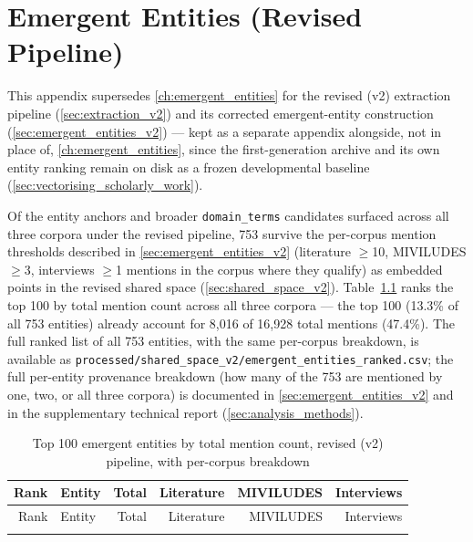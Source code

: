 \chapter{Emergent Entities (Revised Pipeline)}\label{ch:emergent_entities_v2}

This appendix supersedes \ref{ch:emergent_entities} for the revised (v2) extraction pipeline (\ref{sec:extraction_v2}) and its corrected emergent-entity construction (\ref{sec:emergent_entities_v2}) — kept as a separate appendix alongside, not in place of, \ref{ch:emergent_entities}, since the first-generation archive and its own entity ranking remain on disk as a frozen developmental baseline (\ref{sec:vectorising_scholarly_work}).

Of the entity anchors and broader \texttt{domain\_terms} candidates surfaced across all three corpora under the revised pipeline, 753 survive the per-corpus mention thresholds described in \ref{sec:emergent_entities_v2} (literature $\geq$10, MIVILUDES $\geq$3, interviews $\geq$1 mentions in the corpus where they qualify) as embedded points in the revised shared space (\ref{sec:shared_space_v2}). Table~\ref{tab:emergent_entities_v2} ranks the top 100 by total mention count across all three corpora — the top 100 (13.3\% of all 753 entities) already account for 8{,}016 of 16{,}928 total mentions (47.4\%). The full ranked list of all 753 entities, with the same per-corpus breakdown, is available as \texttt{processed/shared\_space\_v2/emergent\_entities\_ranked.csv}; the full per-entity provenance breakdown (how many of the 753 are mentioned by one, two, or all three corpora) is documented in \ref{sec:emergent_entities_v2} and in the supplementary technical report (\ref{sec:analysis_methods}).

\begin{longtable}{@{}r p{5.5cm} r r r r@{}}
\caption{Top 100 emergent entities by total mention count, revised (v2) pipeline, with per-corpus breakdown}\label{tab:emergent_entities_v2} \\
\toprule
Rank & Entity & Total & Literature & MIVILUDES & Interviews \\
\midrule
\endfirsthead
\toprule
Rank & Entity & Total & Literature & MIVILUDES & Interviews \\
\midrule
\endhead
\bottomrule
\endfoot

\end{longtable}
